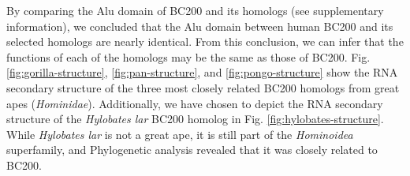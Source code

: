 \documentclass[conference, 11pt]{IEEEtran}
\begin{document}
By comparing the Alu domain of BC200 and its homologs (see supplementary information), we concluded that the Alu domain between human BC200 and its selected homologs are nearly identical. 
From this conclusion, we can infer that the functions of each of the homologs may be the same as those of BC200. 
Fig. \ref{fig:gorilla-structure}, \ref{fig:pan-structure}, and \ref{fig:pongo-structure} show the RNA secondary structure of the three most closely related BC200 homologs from great apes (\emph{Hominidae}). 
Additionally, we have chosen to depict the RNA secondary structure of the \emph{Hylobates lar} BC200 homolog in Fig. \ref{fig:hylobates-structure}. 
While \emph{Hylobates lar} is not a great ape, it is still part of the \emph{Hominoidea} superfamily, and Phylogenetic analysis revealed that it was closely related to BC200.
\end{document}
